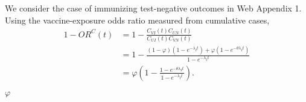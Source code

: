 \begin{appendix}
We consider the case of immunizing test-negative outcomes in Web Appendix 1. Using the vaccine-exposure odds ratio measured from cumulative cases,
$$
\begin{aligned}
1-O R^C(t) & =1-\frac{C_{V I}(t) C_{U N}(t)}{C_{U I}(t) C_{V N}(t)} \\
& =1-\frac{(1-\varphi)\left(1-e^{-\lambda_I t}\right)+\varphi\left(1-e^{-\theta \lambda_I t}\right)}{1-e^{-\lambda_I t}} \\
& =\varphi\left(1-\frac{1-e^{-\theta \lambda_I t}}{1-e^{-\lambda_I t}}\right) .
\end{aligned}
$$

$\varphi$
\end{appendix}

